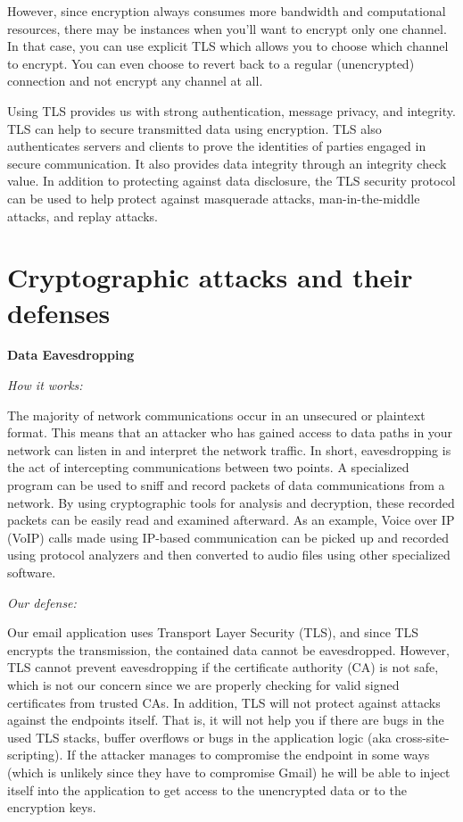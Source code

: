 \documentclass[a4paper,twoside,10pt]{report}
\begin{document}
However, since encryption always consumes more bandwidth and computational resources, there may be instances when you'll want to encrypt only one channel. In that case, you can use explicit TLS which allows you to choose which channel to encrypt.  You can even choose to revert back to a regular (unencrypted) connection and not encrypt any channel at all.

\vspace{2.5mm}

Using TLS provides us with strong authentication, message privacy, and integrity. TLS can help to secure transmitted data using encryption. TLS also authenticates servers and clients to prove the identities of parties engaged in secure communication. It also provides data integrity through an integrity check value. In addition to protecting against data disclosure, the TLS security protocol can be used to help protect against masquerade attacks, man-in-the-middle attacks, and replay attacks.

\noindent
\section{Cryptographic attacks and their defenses}\label{approach}

\noindent
{\large\textbf{Data Eavesdropping}}

\vspace{1mm}
\noindent
\textit{How it works: }

The majority of network communications occur in an unsecured or plaintext format. This means that an attacker who has gained access to data paths in your network can listen in and interpret the network traffic. In short, eavesdropping is the act of intercepting communications between two points. A specialized program can be used to sniff and record packets of data communications from a network. By using cryptographic tools for analysis and decryption, these recorded packets can be easily read and  examined afterward. As an example, Voice over IP (VoIP) calls made using IP-based communication can be picked up and recorded using protocol analyzers and then converted to audio files using other specialized software.

\vspace{2.5mm}
\noindent
\textit{Our defense: }

Our email application uses Transport Layer Security (TLS), and since TLS encrypts the transmission, the contained data cannot be eavesdropped. However, TLS cannot prevent eavesdropping if the certificate authority (CA) is not safe, which is not our concern since we are properly checking for valid signed certificates from trusted CAs. In addition, TLS will not protect against attacks against the endpoints itself. That is, it will not help you if there are bugs in the used TLS stacks, buffer overflows or bugs in the application logic (aka cross-site-scripting). If the attacker manages to compromise the endpoint in some ways (which is unlikely since they have to compromise Gmail) he will be able to inject itself into the application to get access to the unencrypted data or to the encryption keys.
\end{document}
